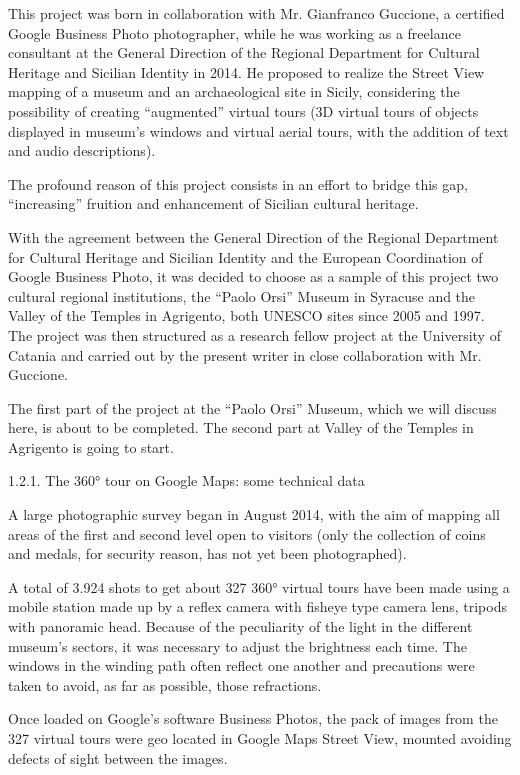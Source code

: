 \documentclass[amsthm,ebook]{saparticle}
\begin{document}
This project was born in collaboration with Mr. Gianfranco Guccione, a certified Google Business Photo photographer,
while he was working as a freelance consultant at the General Direction of the Regional Department for Cultural
Heritage and Sicilian Identity in 2014. He proposed to realize the Street View mapping of a museum and an
archaeological site in Sicily, considering the possibility of creating “augmented” virtual tours (3D virtual tours of
objects displayed in museum’s windows and virtual aerial tours, with the addition of text and audio descriptions). 

The profound reason of this project consists in an effort to bridge this gap, “increasing” fruition and enhancement of
Sicilian cultural heritage. 

With the agreement between the General Direction of the Regional Department for Cultural Heritage and Sicilian Identity
and the European Coordination of Google Business Photo, it was decided to choose as a sample of this project two
cultural regional institutions, the “Paolo Orsi” Museum in Syracuse and the Valley of the Temples in Agrigento, both
UNESCO sites since 2005 and 1997. The project was then structured as a research fellow project at the University of
Catania and carried out by the present writer in close collaboration with Mr. Guccione. 

The first part of the project at the “Paolo Orsi” Museum, which we will discuss here, is about to be completed. The
second part at Valley of the Temples in Agrigento is going to start.


\bigskip

1.2.1. The 360° tour on Google Maps: some technical data

A large photographic survey began in August 2014, with the aim of mapping all areas of the first and second level open
to visitors (only the collection of coins and medals, for security reason, has not yet been photographed). 

A total of 3.924 shots to get about 327 360° virtual tours have been made using a mobile station made up by a reflex
camera with fisheye type camera lens, tripods with panoramic head. Because of the peculiarity of the light in the
different museum’s sectors, it was necessary to adjust the brightness each time. The windows in the winding path often
reflect one another and precautions were taken to avoid, as far as possible, those refractions.

Once loaded on Google’s software Business Photos, the pack of images from the 327 virtual tours were geo located in
Google Maps Street View, mounted avoiding defects of sight between the images. 
\end{document}
